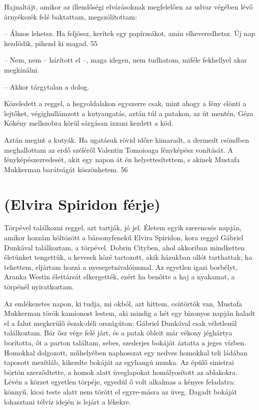 \documentclass{IEEEtran}
\begin{document}
Hajnaltájt, amikor az illendőségi elvárásoknak megfelelően az udvar végében
lévő árnyékszék felé baktattam, megszólítottam:

– Álmos lehetsz. Ha feljössz, kerítek egy papírzsákot, amin elheveredhetsz. Új
nap kezdődik, pihend ki magad.
55

– Nem, nem – hárított el –, maga idegen, nem tudhatom, miféle fekhellyel akar
megkínálni.

– Akkor tárgytalan a dolog.

Közeledett a reggel, a hegyoldalakon egyszerre csak, mint ahogy a fény elönti
a lejtőket, végighullámzott a kutyaugatás, aztán túl a patakon, az út mentén,
Géza Kökény mellszobra körül sárgásan izzani kezdett a köd.

Aztán megint a kutyák. Ha ugatásuk rövid időre kimaradt, a dermedt csöndben
meghallottam az erdő széléről Valentin Tomoioaga fényképész vonítását. A
fényképészezredesét, akit egy napon át én helyettesítettem, s akinek Mustafa
Mukkerman barátságát köszönhetem.
56
\section{(Elvira Spiridon férje)}

Törpével találkozni reggel, azt tartják, jó jel. Életem egyik szerencsés
napján, amikor hozzám költözött a bársonyfenekű Elvira Spiridon, kora reggel
Gábriel Dunkával találkoztam, a törpével. Dobrin Cityben, ahol akkoriban
mindketten életünket tengettük, a kevesek közé tartozott, akik házukban ollót
tarthattak; ha tehettem, eljártam hozzá a nyesegetnivalóimmal. Az egyetlen
igazi borbélyt, Aranka Westin élettársát elkergették, ezért ha benőtte a haj a
nyakamat, a törpénél nyiratkoztam.

Az emlékezetes napon, ki tudja, mi okból, azt hittem, csütörtök van, Mustafa
Mukkerman török kamionost lestem, aki mindig a hét egy bizonyos napján haladt
el a falut megkerülő észak-déli országúton; Gábriel Dunkával csak véletlenül
találkoztam. Bár ősz vége felé járt, és a patak öbleit már vékony jéghártya
borította, őt a parton találtam, sebes, szederjes bokáját áztatta a jeges
vízben. Homokkal dolgozott, műhelyében naphosszat egy nedves homokkal teli
ládában taposott mezítláb, kikezdte bokáját az egyhangú munka. Az épülő
sinistrai börtön szerződtette, a homok alatt üveglapokat homályosított az
ablakokra. Lévén a körzet egyetlen törpéje, egyedül ő volt alkalmas a kényes
feladatra: könnyű, kicsi teste alatt nem törött el egyre-másra az üveg. Dagadt
bokáját lohasztani télvíz idején is lejárt a lékekre.
\end{document}
